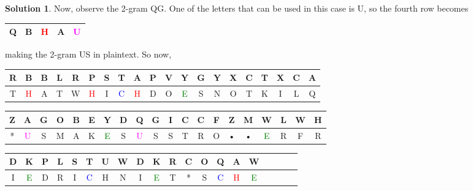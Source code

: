 \documentclass[11pt]{article}
\theoremstyle{definition}\newtheorem{definition}{Definition}
\theoremstyle{definition}\newtheorem{question}{Question}
\theoremstyle{definition}\newtheorem*{solution}{Solution}
\begin{document}
\begin{solution}
    Now, observe the 2-gram QG. One of the letters that can be used in this case is U, so the fourth row becomes
    \begin{center}
        \begin{tabular}{|c|c|c|c|c|} \hline
            Q & B & \textcolor{red}{H} & A & \textcolor{magenta}{U} \\ \hline
        \end{tabular}
    \end{center}
    making the 2-gram US in plaintext. So now,
    \begin{center}
        \begin{tabular}{|cc|cc|cc|cc|cc|cc|cc|cc|cc|cc|} \hline
            R & B & B & L & R & P & S & T & A & P & V & Y & G & Y & X & C & T & X & C & A \\ \hline
            T & \textcolor{red}{H} & A & T & W & \textcolor{red}{H} & I & \textcolor{blue}{C} & \textcolor{red}{H} & D & O & \textcolor{green}{E} & S & N & O & T & K & I & L & Q \\ \hline
        \end{tabular}

        \begin{tabular}{|cc|cc|cc|cc|cc|cc|cc|cc|cc|cc|} \hline
            Z & A & G & O & B & E & Y & D & Q & G & I & C & C & F & Z & M & W & L & W & H \\ \hline
            * & \textcolor{magenta}{U} & S & M & A & K & \textcolor{green}{E} & S & \textcolor{magenta}{U} & S & S & T & R & O & • & • & \textcolor{green}{E} & R & F & R \\ \hline
        \end{tabular}

        \begin{tabular}{|cc|cc|cc|cc|cc|cc|cc|cc|cc|cc|} \hline
            D & K & P & L & S & T & U & W & D & K & R & C & O & Q & A & W \\ \hline
            I & \textcolor{green}{E} & D & R & I & \textcolor{blue}{C} & H & N & I & \textcolor{green}{E} & T & * & S & \textcolor{blue}{C} & \textcolor{red}{H} & \textcolor{green}{E} \\ \hline
        \end{tabular}
    \end{center}


\end{solution}
\end{document}
